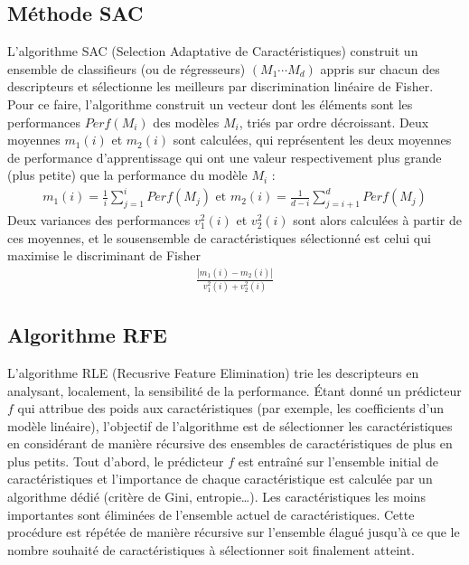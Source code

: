 \documentclass[letterpaper,10pt,french]{sphinxmanual}
\begin{document}
\subsection{Méthode SAC}
\label{\detokenize{selection:methode-sac}}
\sphinxAtStartPar
L’algorithme SAC (Selection Adaptative de Caractéristiques)  construit un ensemble de classifieurs (ou de régresseurs) \((M_1\cdots M_d)\) appris sur chacun des descripteurs et sélectionne les meilleurs par discrimination linéaire de Fisher. Pour ce faire, l’algorithme construit un vecteur dont les éléments sont les performances \(Perf(M_i)\) des modèles \(M_i\), triés par ordre décroissant. Deux moyennes \(m_1(i)\) et \(m_2(i)\) sont calculées, qui représentent les deux moyennes de performance d’apprentissage qui ont une valeur respectivement plus grande (plus petite) que la performance du modèle \(M_i\) :
\begin{equation*}
\begin{split}m_1(i) = \frac{1}{i}\displaystyle\sum_{j=1}^i Perf (M_j)\textrm{ et } m_2(i) = \frac{1}{d-i}\displaystyle\sum_{j=i+1}^d Perf (M_j)\end{split}
\end{equation*}
\sphinxAtStartPar
Deux variances des performances  \(v_1^2(i)\) et \( v_2^2(i)\) sont alors calculées à partir de ces moyennes, et le sous\sphinxhyphen{}ensemble de caractéristiques sélectionné est celui qui maximise le discriminant de Fisher
\begin{equation*}
\begin{split}\frac{|m_1(i)-m_2(i)|}{v_1^2(i)+v_2^2(i)}\end{split}
\end{equation*}

\subsection{Algorithme RFE}
\label{\detokenize{selection:algorithme-rfe}}
\sphinxAtStartPar
L’algorithme RLE (Recusrive Feature Elimination) trie les descripteurs en analysant, localement, la sensibilité de la performance.
Étant donné un prédicteur \(f\) qui attribue des poids aux caractéristiques (par exemple, les coefficients d’un modèle linéaire), l’objectif de l’algorithme est de sélectionner les caractéristiques en considérant de manière récursive des ensembles de caractéristiques de plus en plus petits. Tout d’abord, le prédicteur \(f\) est entraîné sur l’ensemble initial de caractéristiques et l’importance de chaque caractéristique est calculée par un algorithme dédié (critère de Gini, entropie…). Les caractéristiques les moins importantes sont éliminées de l’ensemble actuel de caractéristiques. Cette procédure est répétée de manière récursive sur l’ensemble élagué jusqu’à ce que le nombre souhaité de caractéristiques à sélectionner soit finalement atteint.
\end{document}
